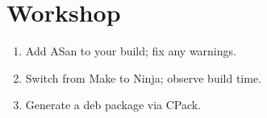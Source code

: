 \section*{Workshop}

\begin{enumerate}[leftmargin=*]
  \item Add ASan to your build; fix any warnings.
  \item Switch from Make to Ninja; observe build time.
  \item Generate a deb package via CPack.
\end{enumerate}
